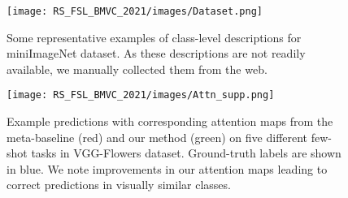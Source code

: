 \documentclass{bmvc2k}
\begin{document}
\begin{figure}
    \centering
    \texttt{[image: RS\_FSL\_BMVC\_2021/images/Dataset.png]}
    \caption{\small Some representative examples of class-level descriptions for miniImageNet dataset. As these descriptions are not readily available, we manually collected them from the web.}
    \label{eg_description}
\end{figure}

\begin{figure}
    \centering
    \texttt{[image: RS\_FSL\_BMVC\_2021/images/Attn\_supp.png]}
    \caption{\small Example predictions with corresponding attention maps from the meta-baseline  (red) and our method (green) on five different few-shot tasks in VGG-Flowers dataset. Ground-truth labels are shown in blue. We note improvements in our attention maps leading to correct predictions in visually similar classes.}
    \label{eg_attn_maps}
\end{figure}

\leavevmode\thispagestyle{empty}\newpage \clearpage
\end{document}
